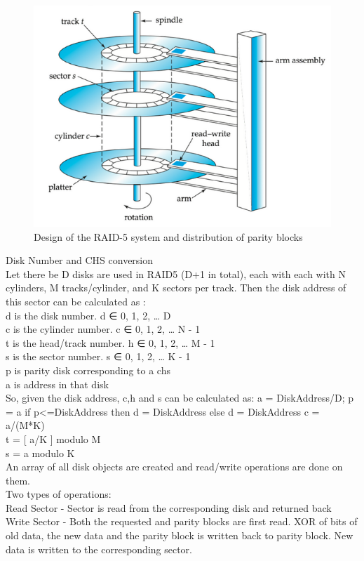 \documentclass[11pt]{article}
\begin{document}
\begin{figure}[ht!]
\center
\includegraphics[scale = 0.80]{images/disk.png}
\caption{Design of the RAID-5 system and distribution of parity blocks}
\label{overflow}
\end{figure}


Disk Number and CHS conversion \\
Let there be D disks are used in RAID5 (D+1 in total), each with each with N cylinders, M tracks/cylinder, and K sectors per track. Then the disk address of this sector can be calculated as :
\\
d is the disk number. d  ∈ {0, 1, 2, …  D} \\
c is the cylinder number. c  ∈ {0, 1, 2, … N - 1} \\
t is the head/track number. h ∈ {0, 1, 2, … M - 1} \\
s is the sector number. s ∈ {0, 1, 2, … K - 1} \\
p is parity disk corresponding to a chs \\
a is address in that disk \\
So, given the disk address, c,h and s can be calculated  as:
a = DiskAddress/D;
p = a%
if p<=DiskAddress%
then d = DiskAddress%
else d = DiskAddress%
c = a/(M*K) \\
t = [ a/K ] modulo M \\
s = a modulo K \\

An array of all disk objects are created and read/write operations are done on them. \\
Two types of operations: \\
Read Sector -  Sector is read from the corresponding disk and returned back \\
Write Sector - Both the requested and parity blocks are first read. XOR of bits of old data, the new data and the parity block is written back to parity block. New data is written to the corresponding sector.
\end{document}
